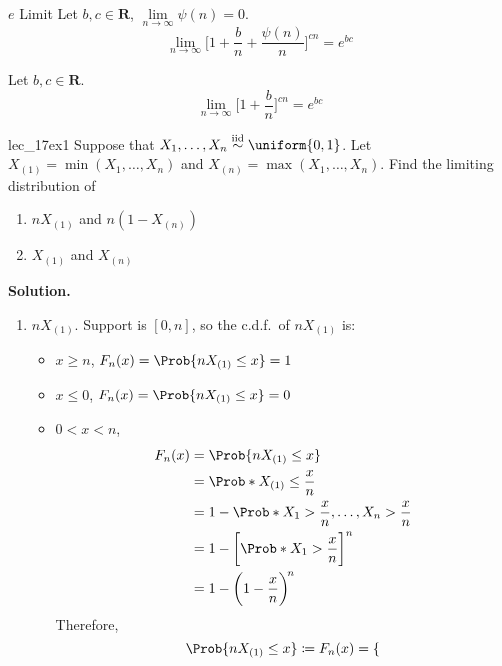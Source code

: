 \begin{Theorem}{$ e $ Limit}{}
    Let $ b,c\in\mathbf{R} $, $ \lim\limits_{{n} \to {\infty}} \psi(n)=0 $.
    \[ \lim\limits_{{n} \to {\infty}}
        \biggl[1+\frac{b}{n} +\frac{\psi(n)}{n} \biggr]^{c n}=e^{b c} \]
\end{Theorem}
\begin{Corollary}{}{}
    Let $ b,c\in\mathbf{R} $.
    \[ \lim\limits_{{n} \to {\infty}}
        \biggl[1+\frac{b}{n}\biggr]^{c n}=e^{b c} \]
\end{Corollary}
\begin{Example}{}{lec_17ex1}
    Suppose that $ X_1,\ldots,X_n\stackrel{\text{iid}}{\sim}
        \uniform{0,1} $. Let $ X_{(1)}=\min(X_1,\ldots,X_n) $
    and $ X_{(n)}=\max(X_1,\ldots,X_n) $. Find the
    limiting distribution of
    \begin{enumerate}[label=(\roman*)]
        \item $ nX_{(1)} $ and $ n(1-X_{(n)}) $
        \item $ X_{(1)} $ and $ X_{(n)} $
    \end{enumerate}
    \textbf{Solution.}
    \begin{enumerate}[label=(\roman*)]
        \item $ nX_{(1)} $. Support is
              $ [0,n] $, so the c.d.f.\ of $ nX_{(1)} $ is:
              \begin{itemize}
                  \item $ x\ge n $, $ F_n(x)=\Prob{n X_{(1)}\le x}=1 $
                  \item $ x\le 0 $, $ F_n(x)=\Prob{n X_{(1)}\le x}=0 $
                  \item $ 0<x<n $,
                        \begin{align*}
                            F_n(x)
                             & =\Prob{n X_{(1)}\le x}                            \\
                             & =\Prob*{X_{(1)}\le \frac{x}{n}}                   \\
                             & =1-\Prob*{X_1>\frac{x}{n},\ldots,X_n>\frac{x}{n}} \\
                             & =1-\biggl[\Prob*{X_1>\frac{x}{n}}\biggr]^{n}      \\
                             & =1-\biggl(1-\frac{x}{n} \biggr)^{\!n}
                        \end{align*}
                        Therefore,
                        \[ \Prob{nX_{(1)}\le x}\coloneq
                            F_n(x)=\begin{dcases}

\end{dcases}\]
\end{itemize}
\end{enumerate}
\end{Example}
